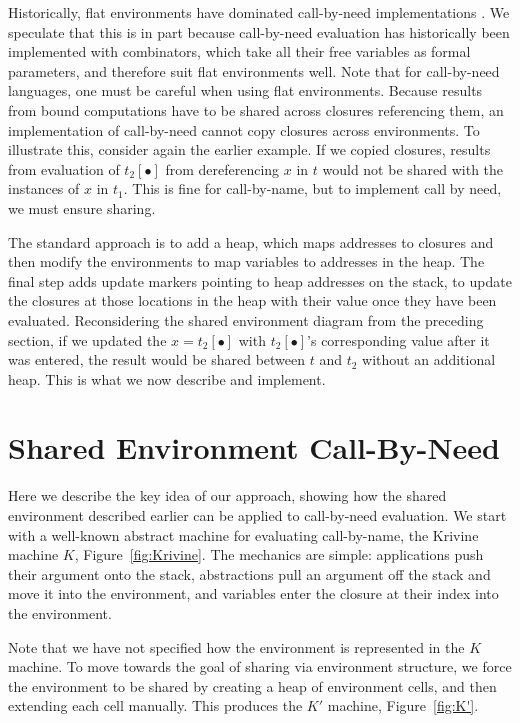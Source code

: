 \documentclass[preprint]{sigplanconf}
\begin{document}
Historically, flat environments have dominated call-by-need implementations
\cite{jonesstg, TIM, johnsson1984efficient, boquist1997grin,
diehl2000abstract}. We speculate that this is in part because call-by-need
evaluation has historically been implemented with combinators, which take all
their free variables as formal parameters, and therefore suit flat environments
well. Note that for call-by-need languages, one must be careful when using flat
environments.  Because results from bound computations have to be shared across
closures referencing them, an implementation of call-by-need cannot copy
closures across environments. To illustrate this, consider again the earlier
example.  If we copied closures, results from evaluation of $t_2[\bullet]$ from
dereferencing $x$ in $t$ would not be shared with the instances of $x$ in
$t_1$.  This is fine for call-by-name, but to implement call by need, we must
ensure sharing.

The standard approach is to add a heap, which maps addresses to closures
\cite{jonesstg, TIM, johnsson1984efficient, sestoft} and then
modify the environments to map variables to addresses in the heap. The final
step adds update markers pointing to heap addresses on the stack, to update
the closures at those locations in the heap with their value once they have been
evaluated.  Reconsidering the shared environment diagram from the preceding
section, if we updated the $x=t_2[\bullet]$ with $t_2[\bullet]$'s corresponding
value after it was entered, the result would be shared between $t$ and $t_2$
without an additional heap. This is what we now describe and implement.

\section{Shared Environment Call-By-Need} \label{sec:calc}

Here we describe the key idea of our approach, showing how
the shared environment described earlier can be applied to call-by-need
evaluation. We start with a well-known abstract machine for evaluating
call-by-name, the Krivine machine $K$, Figure~\ref{fig:Krivine}.
The mechanics are simple: applications push their argument onto the stack,
abstractions pull an argument off the stack and move it into the environment,
and variables enter the closure at their index into the environment.



Note that we have not specified how the environment is represented in the $K$
machine. To move towards the goal of sharing via environment structure,
we force the environment to be shared by creating a heap of environment
cells, and then extending each cell manually. This produces the $K'$ machine,
Figure~\ref{fig:K'}.
\end{document}
